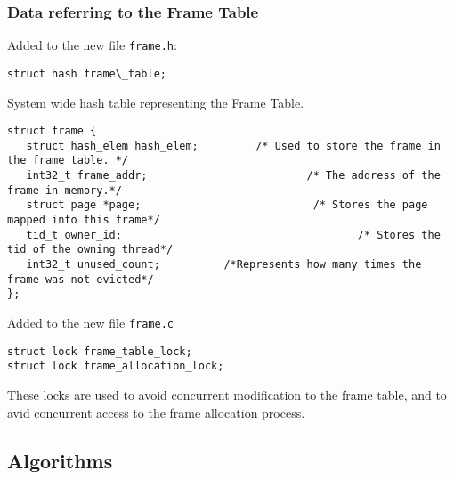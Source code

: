 \documentclass[a4wide, 11pt]{article}
\newcommand{\tx}{\texttt}
\begin{document}
\subsubsection{Data referring to the Frame Table}

Added to the new file \tx{frame.h}:
\begin{verbatim}
struct hash frame\_table;
\end{verbatim}
System wide hash table representing the Frame Table.

\begin{verbatim}
struct frame {
   struct hash_elem hash_elem;		   /* Used to store the frame in the frame table. */
   int32_t frame_addr;				           /* The address of the frame in memory.*/
   struct page *page;				            /* Stores the page mapped into this frame*/
   tid_t owner_id;						               /* Stores the tid of the owning thread*/
   int32_t unused_count;          /*Represents how many times the frame was not evicted*/
};
\end{verbatim}

Added to the new file \tx{frame.c} 
\begin{verbatim}
struct lock frame_table_lock;
struct lock frame_allocation_lock;
\end{verbatim}
These locks are used to avoid concurrent modification to the frame table, and to avid concurrent access to the frame allocation process.



\subsection{Algorithms}
\end{document}
